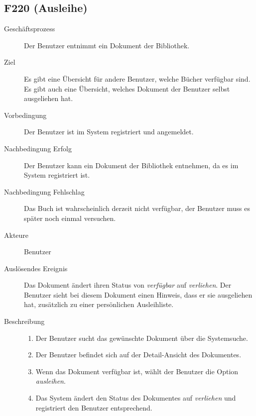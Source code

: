 \subsection{F220 (Ausleihe)}
\begin{description}
  \item[Geschäftsprozess]Der Benutzer entnimmt ein Dokument der Bibliothek.
  \item[Ziel]Es gibt eine Übersicht für andere Benutzer, welche Bücher verfügbar sind. Es gibt auch eine Übersicht, welches Dokument der Benutzer selbst ausgeliehen hat.
  \item[Vorbedingung]Der Benutzer ist im System registriert und angemeldet.
  \item[Nachbedingung Erfolg]Der Benutzer kann ein Dokument der Bibliothek entnehmen, da es im System registriert ist.
  \item[Nachbedingung Fehlschlag]Das Buch ist wahrscheinlich derzeit nicht verfügbar, der Benutzer muss es später noch einmal versuchen.
  \item[Akteure]Benutzer
  \item[Auslösendes Ereignis]Das Dokument ändert ihren Status von \emph{verfügbar} auf \emph{verliehen}. Der Benutzer sieht bei diesem Dokument einen Hinweis, dass er sie ausgeliehen hat, zusätzlich zu einer persönlichen Ausleihliste.
  \item[Beschreibung]\hfill
    \begin{enumerate}
      \item Der Benutzer sucht das gewünschte Dokument über die Systemsuche.
      \item Der Benutzer befindet sich auf der Detail-Ansicht des Dokumentes.
      \item Wenn das Dokument verfügbar ist, wählt der Benutzer die Option \emph{ausleihen}.
      \item Das System ändert den Status des Dokumentes auf \emph{verliehen} und registriert den Benutzer entsprechend.
    \end{enumerate}
\end{description}

